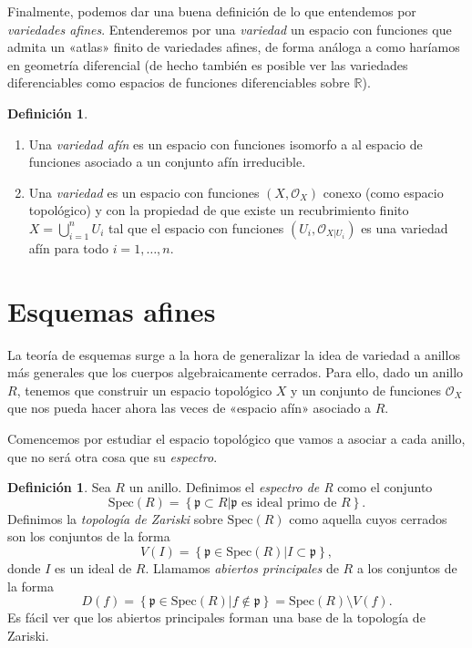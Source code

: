 \documentclass[12pt,a4paper]{article}
\theoremstyle{definition} \newtheorem{defn}[thm]{Definición}
\theoremstyle{definition} \newtheorem{ejemplo}[thm]{Ejemplo}
\theoremstyle{definition} \newtheorem{ejercicio}[thm]{Ejercicio}
\theoremstyle{remark} \newtheorem*{obs}{Observación}
\def\sp{\mathrm{Spec}}
\def\pp{\mathfrak{p}}
\def\RR{\mathbb{R}}
\def\OO{\mathscr{O}}
\begin{document}
      Finalmente, podemos dar una buena definición de lo que entendemos por \emph{variedades afines}. Entenderemos por una \emph{variedad} un espacio con funciones que admita un «atlas» finito de variedades afines, de forma análoga a como haríamos en geometría diferencial (de hecho también es posible ver las variedades diferenciables como espacios de funciones diferenciables sobre $\RR$).
      \begin{defn}\leavevmode
	\begin{enumerate}
      \item Una \emph{variedad afín} es un espacio con funciones isomorfo a al espacio de funciones asociado a un conjunto afín irreducible.
      \item Una \emph{variedad} es un espacio con funciones $(X,\OO_X)$ conexo (como espacio topológico) y con la propiedad de que existe un recubrimiento finito $X=\bigcup_{i=1}^nU_i$ tal que el espacio con funciones $(U_i,\OO_{X|U_i})$ es una variedad afín para todo $i=1,\dots,n$.
    \end{enumerate}
      \end{defn}

      \section{Esquemas afines}
      La teoría de esquemas surge a la hora de generalizar la idea de variedad a anillos más generales que los cuerpos algebraicamente cerrados. Para ello, dado un anillo $R$, tenemos que construir un espacio topológico $X$ y un conjunto de funciones $\OO_X$ que nos pueda hacer ahora las veces de «espacio afín» asociado a $R$.

      Comencemos por estudiar el espacio topológico que vamos a asociar a cada anillo, que no será otra cosa que su \emph{espectro}.
      \begin{defn}
	Sea $R$ un anillo. Definimos el \emph{espectro de R} como el conjunto
	\begin{equation*}
	  \sp(R)=\left\{\pp \subset R | \pp \text{ es ideal primo de } R  \right\}. 
	\end{equation*}
	Definimos la \emph{topología de Zariski} sobre $\sp(R)$ como aquella cuyos cerrados son los conjuntos de la forma
	\begin{equation*}
	  V(I)=\left\{ \pp \in \sp(R) | I\subset \pp \right\},
	\end{equation*}
	donde $I$ es un ideal de $R$. Llamamos \emph{abiertos principales} de $R$ a los conjuntos de la forma
	\begin{equation*}
	  D(f)=\left\{ \pp \in \sp(R)| f \not\in \pp \right\}=\sp(R) \setminus V(f).
	\end{equation*}
	Es fácil ver que los abiertos principales forman una base de la topología de Zariski.
      \end{defn}
\end{document}
